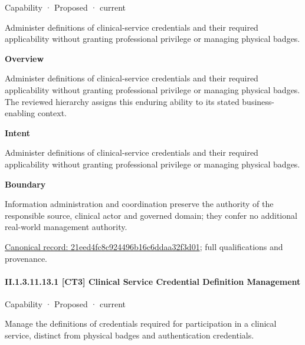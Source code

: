 \label{element:21eed4fc8c924496b16c6ddaa32f3d01}
{\small Capability · Proposed · current}\par

Administer definitions of clinical-service credentials and their required applicability without granting professional privilege or managing physical badges.



\textbf{Overview}



Administer definitions of clinical-service credentials and their required applicability without granting professional privilege or managing physical badges. The reviewed hierarchy assigns this enduring ability to its stated business-enabling context.



\textbf{Intent}



Administer definitions of clinical-service credentials and their required applicability without granting professional privilege or managing physical badges.



\textbf{Boundary}



Information administration and coordination preserve the authority of the responsible source, clinical actor and governed domain; they confer no additional real-world management authority.


{\footnotesize \href{../../../../continuum/strategy/capability/21eed4fc8c924496b16c6ddaa32f3d01.md}{Canonical record: 21eed4fc8c924496b16c6ddaa32f3d01}; full qualifications and provenance.}\par
\paragraph*{II.1.3.11.13.1 [CT3] Clinical Service Credential Definition Management}
\label{navigation:II.1.3.11.13.1}

\label{element:2e5c97f51e7e48d1b865ac416dd8099d}
{\small Capability · Proposed · current}\par

Manage the definitions of credentials required for participation in a clinical service, distinct from physical badges and authentication credentials.



